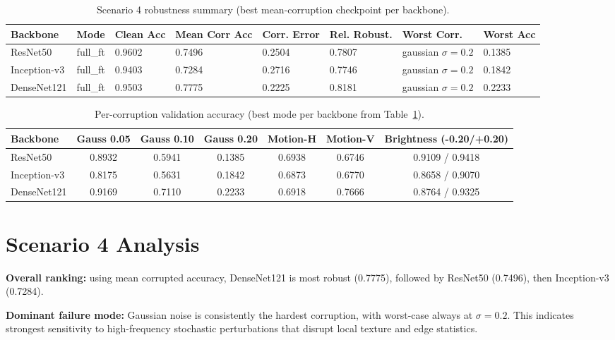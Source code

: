 \documentclass[11pt,a4paper]{report}
\begin{document}
\begin{table}[H]
\centering
\caption{Scenario 4 robustness summary (best mean-corruption checkpoint per backbone).}
\label{tab:s4}
\scriptsize
\begin{tabular}{llllllll}
\toprule
\rowcolor{tableheader}
\textbf{Backbone} & \textbf{Mode} & \textbf{Clean Acc} & \textbf{Mean Corr Acc} & \textbf{Corr. Error} & \textbf{Rel. Robust.} & \textbf{Worst Corr.} & \textbf{Worst Acc} \\
\midrule
ResNet50 & full\_ft & 0.9602 & 0.7496 & 0.2504 & 0.7807 & gaussian $\sigma=0.2$ & 0.1385 \\
Inception-v3 & full\_ft & 0.9403 & 0.7284 & 0.2716 & 0.7746 & gaussian $\sigma=0.2$ & 0.1842 \\
DenseNet121 & full\_ft & 0.9503 & 0.7775 & 0.2225 & 0.8181 & gaussian $\sigma=0.2$ & 0.2233 \\
\bottomrule
\end{tabular}
\end{table}

\begin{table}[H]
\centering
\caption{Per-corruption validation accuracy (best mode per backbone from Table~\ref{tab:s4}).}
\label{tab:s4-per-corruption}
\scriptsize
\begin{tabular}{lcccccc}
\toprule
\rowcolor{tableheader}
\textbf{Backbone} & \textbf{Gauss 0.05} & \textbf{Gauss 0.10} & \textbf{Gauss 0.20} & \textbf{Motion-H} & \textbf{Motion-V} & \textbf{Brightness (-0.20/+0.20)} \\
\midrule
ResNet50 & 0.8932 & 0.5941 & 0.1385 & 0.6938 & 0.6746 & 0.9109 / 0.9418 \\
Inception-v3 & 0.8175 & 0.5631 & 0.1842 & 0.6873 & 0.6770 & 0.8658 / 0.9070 \\
DenseNet121 & 0.9169 & 0.7110 & 0.2233 & 0.6918 & 0.7666 & 0.8764 / 0.9325 \\
\bottomrule
\end{tabular}
\end{table}

\section{Scenario 4 Analysis}
\textbf{Overall ranking:} using mean corrupted accuracy, DenseNet121 is most robust (0.7775), followed by ResNet50 (0.7496), then Inception-v3 (0.7284).

\textbf{Dominant failure mode:} Gaussian noise is consistently the hardest corruption, with worst-case always at $\sigma=0.2$. This indicates strongest sensitivity to high-frequency stochastic perturbations that disrupt local texture and edge statistics.
\end{document}

